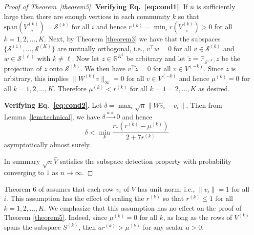 \documentclass[12pt]{article}
\begin{document}
\begin{proof}[Proof of Theorem~\ref{theorem5}]
{\bf Verifying Eq.~\eqref{eq:cond1}}. If $n$ is sufficiently large then
there are enough vertices in each community $k$ so that
$\mathrm{span}(V_{-i}^{(k)}) = \mathcal{S}^{(k)}$ for all $i$ and hence
\(r^{(k)} = \min_{i} r(V_{-i}^{(k)}) > 0\) for
all $k = 1,2,\dots,K$. %
Next, by Theorem \ref{theorem3} we have that the subspaces
  $\{\mathcal{S}^{(1)}, \dots, \mathcal{S}^{(K)}\}$
  are mutually orthogonal, i.e., $v^{\top} w = 0$ for all $v \in
  \mathcal{S}^{(k)}$ and $w \in \mathcal{S}^{(\ell)}$ with $k \not =
  \ell$. Now let $z \in \mathbb{R}^{K^2}$ be arbitrary and let
  $\tilde{z} = \mathbb{P}_{\mathcal{S}^{(k)}} z$ be the projection of
    $z$ onto $\mathcal{S}^{(k)}$. We then have $v^{\top} \tilde{z} =
    0$ for all $v \in V^{(-k)}$. Since $z$ is arbitrary, this implies $\|W^{(k)} v\|_{\infty} = 0$ for all $v
    \in V^{(-k)}$ and hence $\mu^{(k)} = 0$ for all $k
    =1,2,\dots,K$. Therefore $\mu^{(k)} < r^{(k)}$ for all $k =
    1=2,\dots,K$ as desired.


{\bf Verifying Eq.~\eqref{eq:cond2}}.
Let $\delta = \max_{i} \sqrt{n} \|W
\hat{v}_{i} - v_{i}\|$. Then from Lemma~\ref{lem:technical}, we have
\(\delta \stackrel{a.s.}{\to} 0\) and hence
$$\delta < \min_{k} \frac{r_* (r^{(k)} - \mu^{(k)})}{2 + 7 r^{(k)}}$$
asymptotically almost surely. 

In summary $\sqrt{n} \hat{V}$ satisfies the subspace detection property
with probability converging to $1$ as \(n \to \infty\).
\end{proof}

\begin{remark}
Theorem 6 of \citeauthor{jmlr-v28-wang13} assumes that each row $v_i$
of $V$ has unit norm, i.e., $\|v_{i}\| = 1$  for all $i$. This
assumption has the effect of scaling the $r^{(k)}$ so that $r^{(k)}
\leq 1$ for all $k = 1,2,\dots,K$. We emphasize that this assumption
has no effect on the proof of Theorem \ref{theorem5}. Indeed,
since $\mu^{(k)} = 0$ for all $k$, as long as the rows of $V^{(k)}$
spans the subspace $S^{(k)}$, then $a r^{(k)} > \mu^{(k)}$ 
for any scalar $a > 0$. 
\end{remark}
\end{document}
